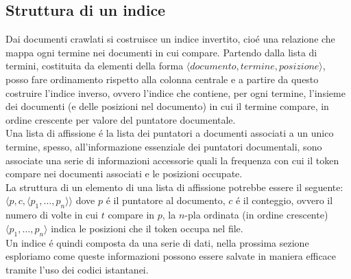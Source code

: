 \subsection{Struttura di un indice}
Dai documenti crawlati si costruisce un indice invertito, cioé una relazione che mappa ogni termine nei documenti in cui compare. Partendo dalla lista di termini, costituita da elementi della forma $\langle documento, termine, posizione \rangle$, posso fare ordinamento rispetto alla colonna centrale e a partire da questo costruire l'indice inverso, ovvero l'indice che contiene, per ogni termine, l'insieme dei documenti (e delle posizioni nel documento) in cui il termine compare, in ordine crescente per valore del puntatore documentale.\\
Una lista di affissione é la lista dei puntatori a documenti associati a un unico termine, spesso, all'informazione essenziale dei puntatori documentali, sono associate una serie di informazioni accessorie quali la frequenza con cui il token compare nei documenti associati e le posizioni occupate.\\
La struttura di un elemento di una lista di affissione potrebbe essere il seguente: $\langle p, c, \langle p_1, \dots, p_n \rangle \rangle$
dove $p$ é il puntatore al documento, $c$ é il conteggio, ovvero il numero di volte in cui $t$ compare in $p$, la $n$-pla ordinata (in ordine crescente) $\langle p_1, \dots, p_n \rangle$ indica le posizioni che il token occupa nel file.\\
Un indice é quindi composta da una serie di dati, nella prossima sezione esploriamo come queste informazioni possono essere salvate in maniera efficace tramite l'uso dei codici istantanei.
